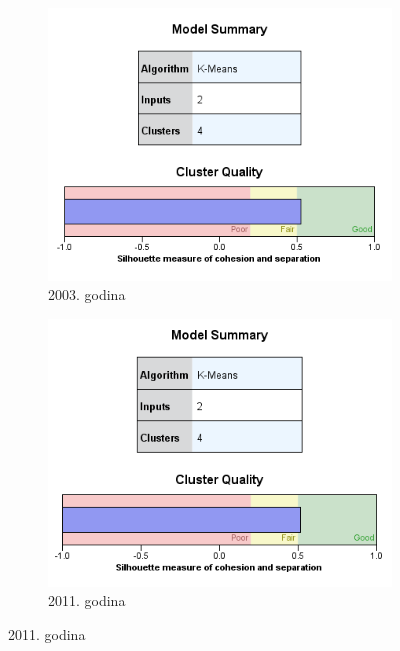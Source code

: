 \documentclass[a4paper]{article}
\begin{document}
\begin{figure}[H]
	\begin{subfigure}[h]{0.45\textwidth}
		\begin{center}
			\includegraphics[scale=0.50]{Klasterovanje/Model_KMeans2003_Silhouette.png}
		\end{center}
		\caption{2003. godina}
		\label{fig:SPSS_Silueta2003}
	\end{subfigure}
	\hfill
	\begin{subfigure}[h]{0.45\textwidth}
		\begin{center}
			\includegraphics[scale=0.50]{Klasterovanje/Model_KMeans2011_Silhouette.png}
		\end{center}
		\caption{2011. godina}
		\label{fig:SPSS_Silueta2011}
	\end{subfigure}
	

\end{figure}
\end{document}
